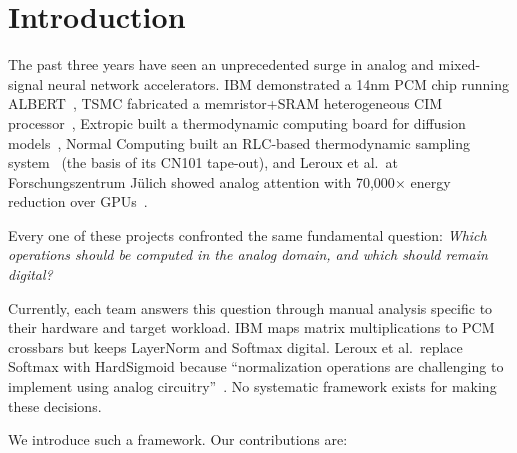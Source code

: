\documentclass[11pt]{article}
\begin{document}
\section{Introduction}

The past three years have seen an unprecedented surge in analog and mixed-signal neural network accelerators. IBM demonstrated a 14nm PCM chip running ALBERT~\cite{ibm2025}, TSMC fabricated a memristor+SRAM heterogeneous CIM processor~\cite{tsmc2025}, Extropic built a thermodynamic computing board for diffusion models~\cite{extropic2025}, Normal Computing built an RLC-based thermodynamic sampling system~\cite{normal2025} (the basis of its CN101 tape-out), and Leroux et al.\ at Forschungszentrum J\"ulich showed analog attention with 70,000$\times$ energy reduction over GPUs~\cite{leroux2025a}.

Every one of these projects confronted the same fundamental question: \textit{Which operations should be computed in the analog domain, and which should remain digital?}

Currently, each team answers this question through manual analysis specific to their hardware and target workload. IBM maps matrix multiplications to PCM crossbars but keeps LayerNorm and Softmax digital. Leroux et al.\ replace Softmax with HardSigmoid because ``normalization operations are challenging to implement using analog circuitry''~\cite{leroux2025a}. No systematic framework exists for making these decisions.

We introduce such a framework. Our contributions are:
\end{document}
